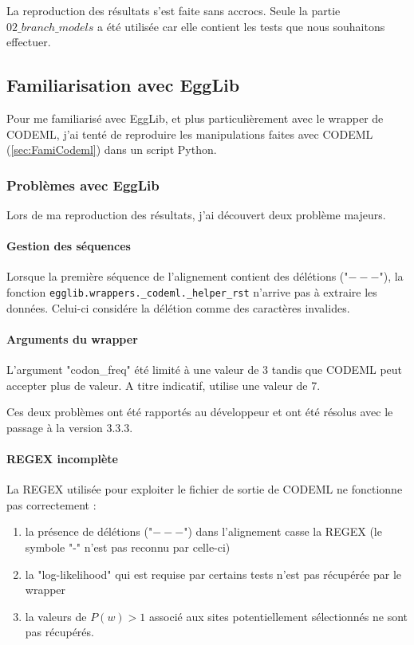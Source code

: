 \documentclass[../main]{subfiles} %
\begin{document}
La reproduction des résultats s'est faite sans accrocs. Seule la partie $02\_branch\_models$ a été utilisée car elle contient les tests que nous souhaitons effectuer.


\subsection{Familiarisation avec  \gls{EggLib}}

Pour me familiarisé avec \gls{EggLib}, et plus particulièrement avec le \gls{wrapper} de  \gls{CODEML}, j'ai tenté de reproduire les manipulations faites avec \gls{CODEML} (\cref{sec:FamiCodeml}) dans un script \gls{Python}.

\subsubsection{Problèmes avec \gls{EggLib}}
Lors de ma reproduction des résultats, j'ai découvert deux problème majeurs.

\paragraph{Gestion des séquences} Lorsque la première séquence de l'alignement contient des délétions ("$---$"), la fonction \lstinline {egglib.wrappers._codeml._helper_rst} n'arrive pas à extraire les données. Celui-ci considére la délétion comme des caractères invalides.

\paragraph{Arguments du \gls{wrapper}} L'argument "codon\_freq" été limité à une valeur de 3 tandis que \gls{CODEML} peut accepter plus de valeur. A titre indicatif, \cite{alvarez-carretero_beginners_2023} utilise une valeur de 7. 

\vspace{1em}
Ces deux problèmes ont été rapportés au développeur et ont été résolus avec le passage à la version $3.3.3$.

\paragraph{\acrshort{REGEX} incomplète}
La \acrshort{REGEX} utilisée pour exploiter le fichier de sortie de \gls{CODEML} ne fonctionne pas  correctement :

\begin{enumerate}
    \item la présence de délétions ("$---$") dans l'alignement casse la \acrshort{REGEX} (le symbole "-" n'est pas reconnu par celle-ci)
    \item la "log-likelihood" qui est requise par certains tests n'est pas récupérée par le \gls{wrapper}
    \item la valeurs de $P(w)>1$ associé aux sites potentiellement sélectionnés ne sont pas récupérés.
\end{enumerate}
\end{document}
